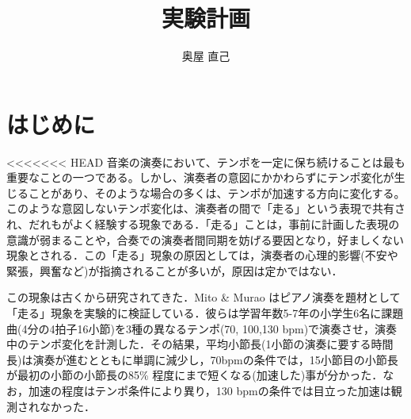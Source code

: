 \documentclass[twocolumn,10pt]{jarticle}
\title{実験計画}
\author{奥屋 直己}
\begin{document}
\maketitle

\section{はじめに}
<<<<<<< HEAD
音楽の演奏において、テンポを一定に保ち続けることは最も重要なことの一つである。しかし、演奏者の意図にかかわらずにテンポ変化が生じることがあり、そのような場合の多くは、テンポが加速する方向に変化する。このような意図しないテンポ変化は、演奏者の間で「走る」という表現で共有され、だれもがよく経験する現象である．「走る」ことは，事前に計画した表現の意識が弱まることや，合奏での演奏者間同期を妨げる要因となり，好ましくない現象とされる．この「走る」現象の原因としては，演奏者の心理的影響(不安や緊張，興奮など)が指摘されることが多いが，原因は定かではない．

この現象は古くから研究されてきた．Mito \& Murao \cite{Mito}はピアノ演奏を題材として「走る」現象を実験的に検証している．彼らは学習年数5-7年の小学生6名に課題曲(4分の4拍子16小節)を3種の異なるテンポ(70, 100,130 bpm)で演奏させ，演奏中のテンポ変化を計測した．その結果，平均小節長(1小節の演奏に要する時間長)は演奏が進むとともに単調に減少し，70bpmの条件では，15小節目の小節長が最初の小節の小節長の85\% 程度にまで短くなる(加速した)事が分かった．なお，加速の程度はテンポ条件により異り，130 bpmの条件では目立った加速は観測されなかった．
\end{document}
